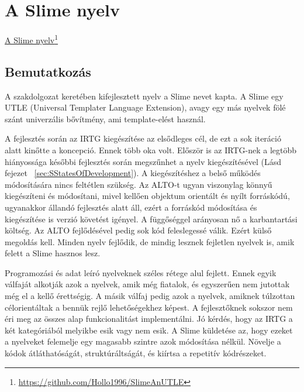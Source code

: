 
\chapter{A Slime nyelv}{\href{https://github.com/Hollo1996/SlimeAnUTLE}{A Slime nyelv}\footnote{\url{https://github.com/Hollo1996/SlimeAnUTLE}}}
\label{sec:Slime}
\section{Bemutatkozás}
\label{sec:SIntro}
A szakdolgozat keretében kifejlesztett nyelv a Slime nevet kapta.
A Slime egy UTLE (Universal Templater Language Extension), 
avagy egy más nyelvek fölé szánt univerzális bővítmény, ami template-elést használ.

A fejlesztés során az IRTG kiegészítése az elsődleges cél, de ezt a sok iteráció alatt kinőtte a koncepció. 
Ennek több oka volt. 
Először is az IRTG-nek a legtöbb hiányossága későbbi fejlesztés során megszűnhet a nyelv kiegészítésével (Lásd fejezet ~\ref{sec:SStatesOfDevelopment}).
A kiegészítéshez a belső működés módosítására nincs feltétlen szükség. 
Az ALTO-t ugyan viszonylag könnyű kiegészíteni és módosítani, mivel kellően objektum orientált és nyílt forráskódú,
ugyanakkor állandó fejlesztés alatt áll, ezért a forráskód módosítása és kiegészítése is verzió követést igényel. 
A függőséggel arányosan nő a karbantartási költség. 
Az ALTO fejlődésével pedig sok kód feleslegessé válik. 
Ezért külső megoldás kell. 
Minden nyelv fejlődik, de mindig lesznek fejletlen nyelvek is, amik felett a Slime hasznos lesz.

Programozási és adat leíró nyelveknek széles rétege alul fejlett. 
Ennek egyik válfaját alkotják azok a nyelvek, amik még fiatalok, és egyszerűen nem jutottak még el a kellő érettségig. 
A másik válfaj pedig azok a nyelvek, amiknek túlzottan célorientáltak a bennük rejlő lehetőségekhez képest.
A fejlesztőknek sokszor nem éri meg az összes alap funkcionalitást implementálni. 
Jó kérdés, hogy az IRTG a két kategóriából melyikbe esik vagy nem esik. 
A Slime küldetése az, hogy ezeket a nyelveket felemelje egy magasabb szintre azok módosítása nélkül. 
Növelje a kódok átláthatóságát, struktúráltságát, és kiírtsa a repetitív kódrészeket.

